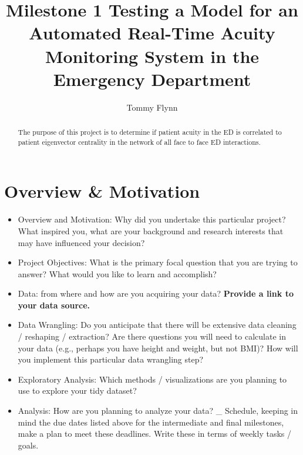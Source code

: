 \documentclass[]{elsarticle} %
\providecommand{\tightlist}{%
  \setlength{\itemsep}{0pt}\setlength{\parskip}{0pt}}
\begin{document}
\begin{frontmatter}

  \title{Milestone 1 Testing a Model for an Automated Real-Time Acuity Monitoring
System in the Emergency Department}
    \author[Emory University]{Tommy Flynn}
      \address[Emory University]{Emory University Nell Hodgson School of Nursing, 1520 Clifton Road NE,
Atlanta, GA, 30322}
  
  \begin{abstract}
  The purpose of this project is to determine if patient acuity in the ED
  is correlated to patient eigenvector centrality in the network of all
  face to face ED interactions.
  \end{abstract}
  
 \end{frontmatter}

\section{Overview \& Motivation}\label{overview-motivation}

\begin{itemize}
\tightlist
\item
  Overview and Motivation: Why did you undertake this particular
  project? What inspired you, what are your background and research
  interests that may have influenced your decision?
\item
  Project Objectives: What is the primary focal question that you are
  trying to answer? What would you like to learn and accomplish?
\item
  Data: from where and how are you acquiring your data? \textbf{Provide
  a link to your data source.}
\item
  Data Wrangling: Do you anticipate that there will be extensive data
  cleaning / reshaping / extraction? Are there questions you will need
  to calculate in your data (e.g., perhaps you have height and weight,
  but not BMI)? How will you implement this particular data wrangling
  step?
\item
  Exploratory Analysis: Which methods / visualizations are you planning
  to use to explore your tidy dataset?
\item
  Analysis: How are you planning to analyze your data? \_ Schedule,
  keeping in mind the due dates listed above for the intermediate and
  final milestones, make a plan to meet these deadlines. Write these in
  terms of weekly tasks / goals.
\end{itemize}
\end{document}

